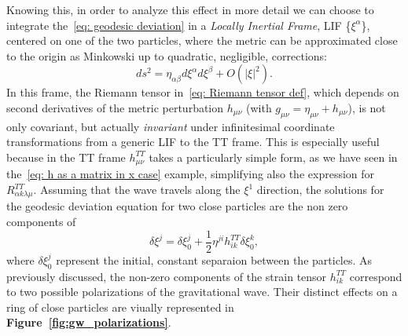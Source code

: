 Knowing this, in order to analyze this effect in more detail we can choose to integrate the~\eqref{eq: geodesic deviation} in a \textit{Locally Inertial Frame}, LIF \{$\xi^\alpha$\}, centered on one of the two particles, where the metric can be approximated close to the origin as Minkowski up to quadratic, negligible, corrections:
\[
    ds^2 = \eta_{\alpha\beta} d\xi^\alpha d\xi^\beta + O(|\xi|^2).
\]
In this frame, the Riemann tensor in~\eqref{eq: Riemann tensor def}, which depends on second derivatives of the metric perturbation $h_{\mu\nu}$ (with $g_{\mu\nu} = \eta_{\mu\nu} + h_{\mu\nu}$), is not only covariant, but actually \textit{invariant} under infinitesimal coordinate transformations from a generic LIF to the TT frame. 
This is especially useful because in the TT frame $h^{TT}_{\mu\nu}$ takes a particularly simple form, as we have seen in the~\eqref{eq: h as a matrix in x case} example, simplifying also the expression for $R^{TT}_{\alpha k \lambda \mu}$. 
Assuming that the wave travels along the $\xi^1$ direction, the solutions for the geodesic deviation equation for two close particles are the non zero components of 
\begin{equation}
    \delta\xi^j = \delta\xi_0^j + \frac{1}{2}\eta^{ji} h^{TT}_{ik} \delta\xi_0^k,
    \label{eq: solution of geodesic deviation}
\end{equation}
where $\delta\xi_0^j$ represent the initial, constant separaion between the particles. 
As previously discussed, the non-zero components of the strain tensor $h_{ik}^{TT}$ correspond to two possible polarizations of the gravitational wave. 
Their distinct effects on a ring of close particles are viually represented in \textbf{Figure~\ref{fig:gw_polarizations}}.
